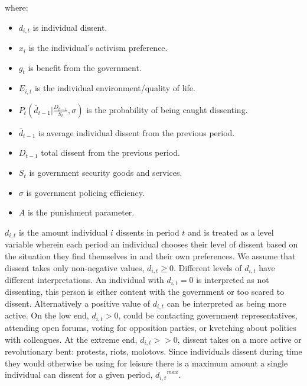\documentclass[12pt]{article}
\begin{document}
\begin{spacing}{1.5}
\noindent where:
\begin{itemize}
	\item $d_{i,t}$ is individual dissent.  
	\item ${x}_i$ is the individual's activism preference. 
	\item $g_t$ is benefit from the government. 
	\item $E_{i,t}$ is the individual environment/quality of life. 
	\item $P_t \left( \bar{d}_{t-1} \Bigg|\frac{D_{t-1}}{S_t},\sigma \right)$ is the probability of being caught dissenting. 
	\item $\bar{d}_{t-1}$ is average individual dissent from the previous period.  
	\item $D_{t-1}$ total dissent from the previous period.
	\item $S_t$ is government security goods and services. 
	\item $\sigma$ is government policing efficiency. 
	\item $A$ is the punishment parameter. 
\end{itemize}
 
$ d_{i,t} $ is the amount individual $i$ dissents in period $t$ and is treated as a level variable wherein each period an individual chooses their level of dissent based on the situation they find themselves in and their own preferences. We assume that dissent takes only non-negative values, $d_{i,t}\geq0$. Different levels of $d_{i,t}$ have different interpretations. An individual with $d_{i,t}=0$ is interpreted as not dissenting, this person is either content with the government or too scared to dissent. Alternatively a positive value of $d_{i,t}$ can be interpreted as being more active. On the low end, $d_{i,t}>0$, could be contacting government representatives, attending open forums, voting for opposition parties, or kvetching about politics with colleagues. At the extreme end, $d_{i,t}>>0$, dissent takes on a more active or revolutionary bent: protests, riots, molotovs. Since individuals dissent during time they would otherwise be using for leisure there is a maximum amount a single individual can dissent for a given period, ${d_{i,t}}^{max}$. 


\end{spacing}
\end{document}
